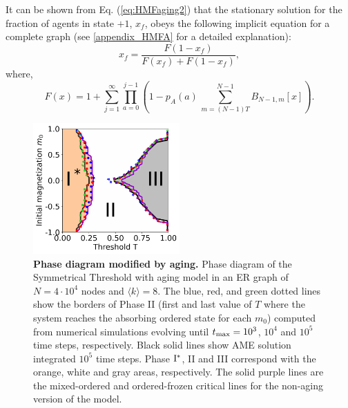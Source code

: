 It can be shown from Eq. (\ref{eq:HMFaging2}) that the stationary solution  for the fraction of agents in state $+1$, $x_f$, obeys the following implicit equation for a complete graph (see \ref{appendix_HMFA} for a detailed explanation):
\begin{equation}
    x_f = \frac{F(1 - x_f)}{F(x_f) + F(1-x_f)},
    \label{eq:x_f}
\end{equation}
where,
\begin{equation}
    F(x) = 1 + \sum_{j=1}^{\infty} \prod_{a=0}^{j-1} \left( 1 - p_A(a) \, \sum_{m = (N-1)T}^{N-1} B_{N-1,m}[x] \right).
    \label{eq:F(A)}
\end{equation}

\begin{figure}[t]
        \centering
        \includegraphics[width=0.5\textwidth]{Figs/Aging_STM/FIG5.pdf}
        \caption{\label{ER_REG_PDAGING} \textbf{Phase diagram modified by aging.} Phase diagram of the Symmetrical Threshold with aging model in an ER graph of $N = 4 \cdot 10^4$ nodes and $\langle k \rangle = 8$. The blue, red, and green dotted lines show the borders of Phase II (first and last value of $T$ where the system reaches the absorbing ordered state for each $m_0$) computed from numerical simulations evolving until $t_{\rm max} = 10^3$, $10^4$ and $10^5$ time steps, respectively. Black solid lines show AME solution integrated $10^5$ time steps. Phase ${\rm I}^{*}$, II and III correspond with the orange, white and gray areas, respectively. The solid purple lines are the mixed-ordered and ordered-frozen critical lines for the non-aging version of the model.}
\end{figure}

